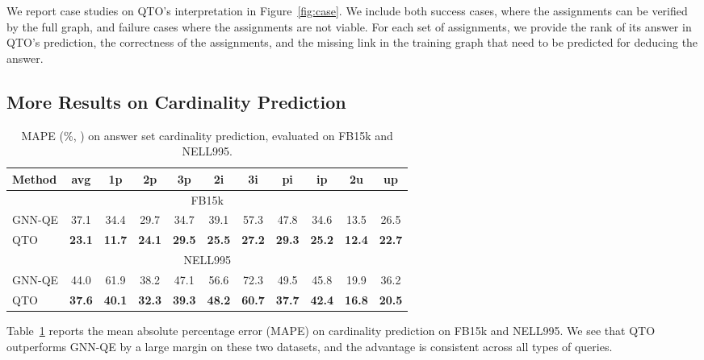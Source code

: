 We report case studies on QTO's interpretation in Figure~\ref{fig:case}. We include both success cases, where the assignments can be verified by the full graph, and failure cases where the assignments are not viable.
For each set of assignments, we provide the rank of its answer in QTO's prediction, the correctness of the assignments, and the missing link in the training graph that need to be predicted for deducing the answer.

\subsection{More Results on Cardinality Prediction}
\label{app:card}

\begin{table}[!h]
    \centering
    \begin{tabular}{lcccccccccc}
        \toprule
        \bf{Method} & \bf{avg} & \bf{1p} & \bf{2p} & \bf{3p} & \bf{2i} & \bf{3i} & \bf{pi} & \bf{ip} & \bf{2u} & \bf{up} \\
        \midrule
        \multicolumn{11}{c}{FB15k} \\
        \midrule
        GNN-QE & 37.1 & 34.4 & 29.7 & 34.7 & 39.1 & 57.3 & 47.8 & 34.6 & 13.5 & 26.5 \\
        QTO & \bf{23.1} & \bf{11.7} & \bf{24.1} & \bf{29.5} & \bf{25.5} & \bf{27.2} & \bf{29.3} & \bf{25.2} & \bf{12.4} & \bf{22.7} \\
        \midrule
        \multicolumn{11}{c}{NELL995} \\
        \midrule
        GNN-QE & 44.0 & 61.9 & 38.2 & 47.1 & 56.6 & 72.3 & 49.5 & 45.8 & 19.9 & 36.2 \\
        QTO & \bf{37.6} & \bf{40.1} & \bf{32.3} & \bf{39.3} & \bf{48.2} & \bf{60.7} & \bf{37.7} & \bf{42.4} & \bf{16.8} & \bf{20.5} \\
        \bottomrule
    \end{tabular}
    \caption{MAPE (\%, ) on answer set cardinality prediction, evaluated on FB15k and NELL995.}
    \label{tb:mape1}
\end{table}

Table~\ref{tb:mape1} reports the mean absolute percentage error (MAPE) on cardinality prediction on FB15k and NELL995.
We see that QTO outperforms GNN-QE by a large margin on these two datasets, and the advantage is consistent across all types of queries.
